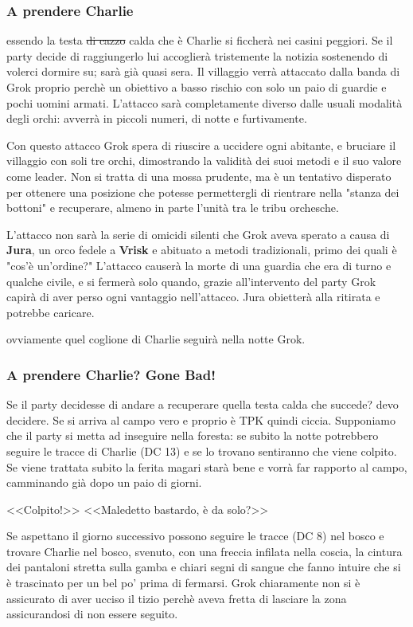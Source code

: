 \documentclass[10pt,twoside, twocolumn, openany]{dndbook}
\begin{document}
\subsubsection{A prendere Charlie}
essendo la testa \sout{di cazzo} calda che è Charlie si ficcherà nei casini peggiori. Se il party decide di raggiungerlo lui accoglierà tristemente la notizia sostenendo di volerci dormire su; sarà già quasi sera. Il villaggio verrà attaccato dalla banda di Grok proprio perchè un obiettivo a basso rischio con solo un paio di guardie e pochi uomini armati. 
L'attacco sarà completamente diverso dalle usuali modalità degli orchi: avverrà in piccoli numeri, di notte e furtivamente.

Con questo attacco Grok spera di riuscire a uccidere ogni abitante, e bruciare il villaggio con soli tre orchi, dimostrando la validità dei suoi metodi e il suo valore come leader. 
Non si tratta di una mossa prudente, ma è un tentativo disperato per ottenere una posizione che potesse permettergli di rientrare nella "stanza dei bottoni" e recuperare, almeno in parte l'unità tra le tribu orchesche.

L'attacco non sarà la serie di omicidi silenti che Grok aveva sperato a causa di \textbf{Jura}, un orco fedele a \textbf{Vrisk} e abituato a metodi tradizionali, primo dei quali è "cos'è un'ordine?"
L'attacco causerà la morte di una guardia che era di turno e qualche civile, e si fermerà solo quando, grazie all'intervento del party Grok capirà di aver perso ogni vantaggio nell'attacco. Jura obietterà alla ritirata e potrebbe caricare. 

ovviamente quel coglione di Charlie seguirà nella notte Grok.

\subsubsection{A prendere Charlie? Gone Bad!}

Se il party decidesse di andare a recuperare quella testa calda che succede? devo decidere.
Se si arriva al campo vero e proprio è TPK quindi ciccia. Supponiamo che il party si metta ad inseguire nella foresta: 
se subito la notte potrebbero seguire le tracce di Charlie (DC 13) e se lo trovano sentiranno che viene colpito.
Se viene trattata subito la ferita magari starà bene e vorrà far rapporto al campo, camminando già dopo un paio di giorni.
\begin{DndReadAloud}
  <<Colpito!>>
  <<Maledetto bastardo, è da solo?>>
\end{DndReadAloud}
Se aspettano il giorno successivo possono seguire le tracce (DC 8) nel bosco e trovare Charlie nel bosco, svenuto, con una freccia infilata nella coscia, la cintura dei pantaloni stretta sulla gamba e chiari segni di sangue che fanno intuire che si è trascinato per un bel po' prima di fermarsi.
Grok chiaramente non si è assicurato di aver ucciso il tizio perchè aveva fretta di lasciare la zona assicurandosi di non essere seguito. 
\end{document}
